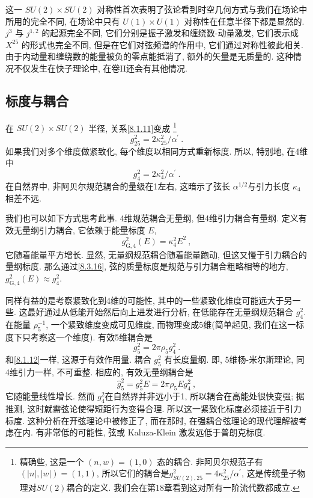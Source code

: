 这一 $S U(2) \times S U(2)$ 对称性首次表明了弦论看到时空几何方式与我们在场论中所用的完全不同, 
在场论中只有 $U(1) \times U(1)$ 对称性在任意半径下都是显然的.  $j^{3}$ 与 $j^{1,2}$ 的起源完全不同, 它们分别是振子激发和缠绕数-动量激发, 
它们表示成 $X^{25}$ 的形式也完全不同, 但是在它们对弦频谱的作用中, 它们通过对称性彼此相关. 由于内动量和缠绕数的能量被负的零点能抵消了, 额外的矢量是无质量的. 
这种情况不仅发生在快子理论中, 在卷II还会有其他情况.

\subsection*{标度与耦合}

在 $S U(2) \times S U(2)$ 半径, 关系\eqref{8.1.11}变成
\footnote{精确些, 这是一个 $(n, w)=(1,0)$ 态的耦合. 非阿贝尔规范子有$(|n|,|w|)=(1,1)$, 
所以它们的耦合是$g_{S U(2), 25}^{2}=4 \kappa_{25}^{2} / \alpha^{\prime}$, 这是传统量子物理对$SU(2)$耦合的定义. 
我们会在第18章看到这对所有一阶流代数都成立.}
\begin{equation}
	g_{25}^{2}=2 \kappa_{25}^{2} / \alpha^{\prime} \:. \label{8.3.15}
\end{equation}
如果我们对多个维度做紧致化, 每个维度以相同方式重新标度. 所以, 特别地, 在4维中
\begin{equation}
	g_{4}^{2}=2 \kappa_{4}^{2} / \alpha^{\prime} \:. \label{8.3.16}
\end{equation}
在自然界中, 非阿贝尔规范耦合的量级在1左右, 这暗示了弦长 $\alpha^{1 / 2}$与引力长度 $\kappa_{4}$相差不远.

我们也可以如下方式思考此事. 4维规范耦合无量纲, 但4维引力耦合有量纲. 定义有效无量纲引力耦合, 它依赖于能量标度 $E$,
\begin{equation}
	g_{\mathrm{G}, 4}^{2}(E)=\kappa_{4}^{2} E^{2} \:, \label{8.3.17}
\end{equation}
它随着能量平方增长. 显然, 无量纲规范耦合随着能量跑动, 但这又慢于引力耦合的量纲标度. 那么通过\eqref{8.3.16}, 弦的质量标度是规范与引力耦合粗略相等的地方, 
$g_{\mathrm{G}, 4}^{2}(E) \approx g_{4}^{2}$.

同样有益的是考察紧致化到4维的可能性, 其中的一些紧致化维度可能远大于另一些. 这最好通过从低能开始然后向上进发进行分析, 在低能存在无量纲规范耦合 $g_{4}^{2}$. 
在能量 $\rho_{5}^{-1}$, 一个紧致维度变成可见维度, 而物理变成5维(简单起见, 我们在这一标度下只考察这一个维度). 有效5维耦合是
\begin{equation}
	g_{5}^{2}=2 \pi \rho_{5} g_{4}^{2} \:. \label{8.3.18}
\end{equation}
和\eqref{8.1.12}一样, 这源于有效作用量. 耦合 $g_{5}^{2}$ 有长度量纲. 即, 5维杨-米尔斯理论, 同4维引力一样, 不可重整. 相应的, 有效无量纲耦合是
\begin{equation}
	\hat{g}_{5}^{2}=g_{5}^{2} E=2 \pi \rho_{5} E g_{4}^{2} \:, \label{8.3.19}
\end{equation}
它随能量线性增长. 然而 $g_{4}^{2}$在自然界并非远小于1, 所以耦合在高能处很快变强; 据推测, 这时就需弦论使得短距行为变得合理. 
所以这一紧致化标度必须接近于引力标度. 这种分析在开弦理论中被修正了, 而在那时, 在强耦合弦理论的现代理解被考虑在内. 
有非常低的可能性, 弦或 Kaluza-Klein 激发远低于普朗克标度.

